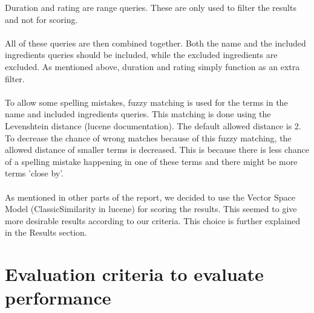 \documentclass{article}
\begin{document}
Duration and rating are range queries.
These are only used to filter the results and not for scoring.
\\~\\
All of these queries are then combined together.
Both the name and the included ingredients queries should be included,
while the excluded ingredients are excluded.
As mentioned above, duration and rating simply function as an extra filter.
\\~\\
To allow some spelling mistakes, fuzzy matching is used for the terms in the
name and included ingredients queries.
This matching is done using the Levenshtein distance (lucene documentation).
The default allowed distance is 2.
To decrease the chance of wrong matches because of this fuzzy matching,
the allowed distance of smaller terms is decreased.
This is because there is less chance of a spelling mistake happening in one
of these terms and there might be more terms 'close by'.
\\~\\
As mentioned in other parts of the report,
we decided to use the Vector Space Model (ClassicSimilarity in lucene) for scoring
the results.
This seemed to give more desirable results according to our criteria.
This choice is further explained in the Results section.

\section{Evaluation criteria to evaluate performance}
\end{document}
